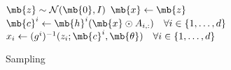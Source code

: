 




\begin{figure}[h]
\begin{algorithm}[H]
  \caption{Sampling} \label{alg:inversion}
  \small
  \begin{algorithmic}[1]
    \State $\mb{z} \sim \mathcal{N}(\mb{0}, I)$
    \State $\mb{x} \gets \mb{z}$
    \Repeat
      \State $\mb{c}^i \gets \mb{h}^i(\mb{x} \odot A_{i, :}) \quad \forall i \in \{1, \dots, d\}$
      \State $x_i \gets (g^i)^{-1}(z_i; \mb{c}^i, \mb{\theta}) \quad \forall i \in \{1, \dots, d\}$
  \end{algorithmic}
\end{algorithm}
\end{figure}
